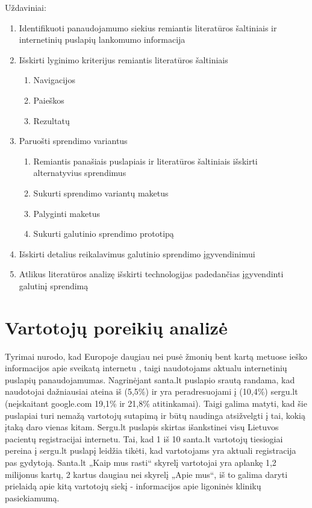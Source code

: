 \documentclass{VUMIFPSkursinis}
\begin{document}
Uždaviniai:
\begin{enumerate}
	\item Identifikuoti panaudojamumo siekius remiantis literatūros šaltiniais ir internetinių puslapių lankomumo informacija
	\item Išskirti lyginimo kriterijus remiantis literatūros šaltiniais
	\renewcommand*{\theenumii}{\theenumi.\arabic{enumii}}
	\renewcommand{\labelenumii}{\theenumii}
	\begin{enumerate}
		\item Navigacijos
		\item Paieškos
		\item Rezultatų
	\end{enumerate}
	\item Paruošti sprendimo variantus
	\begin{enumerate}
		\item Remiantis panašiais puslapiais ir literatūros šaltiniais išskirti alternatyvius sprendimus
		\item Sukurti sprendimo variantų maketus
		\item Palyginti maketus
		\item Sukurti galutinio sprendimo prototipą
	\end{enumerate}
	\item Išskirti detalius reikalavimus galutinio sprendimo įgyvendinimui
	\item Atlikus literatūros analizę išskirti technologijas padedančias įgyvendinti galutinį sprendimą
\end{enumerate}

\section{Vartotojų poreikių analizė}
Tyrimai nurodo, kad Europoje daugiau nei pusė žmonių bent kartą metuose ieško informacijos apie sveikatą internetu \cite{EuCitizDigHealthEn}, taigi naudotojams aktualu internetinių puslapių panaudojamumas. Nagrinėjant santa.lt puslapio srautą randama, kad naudotojai dažniausiai ateina iš (5,5\%) ir yra peradresuojami į (10,4\%) sergu.lt (neįskaitant google.com 19,1\% ir 21,8\% atitinkamai)\cite{AlexaSantaEn}. Taigi galima matyti, kad šie puslapiai turi nemažą vartotojų sutapimą ir būtų naudinga atsižvelgti į tai, kokią įtaką daro vienas kitam. Sergu.lt puslapis skirtas išankstinei visų Lietuvos pacientų registracijai internetu. Tai, kad 1 iš 10 santa.lt vartotojų tiesiogiai pereina į sergu.lt puslapį leidžia tikėti, kad vartotojams yra aktuali registracija pas gydytoją. Santa.lt „Kaip mus rasti“ skyrelį vartotojai yra aplankę 1,2 milijonus kartų\cite{VulSkKaipMusRastiLt}, 2 kartus daugiau nei skyrelį „Apie mus“\cite{VulSkApieMusLt}, iš to galima daryti prielaidą apie kitą vartotojų siekį - informacijos apie ligoninės klinikų pasiekiamumą.
\vspace{0,5cm}
\end{document}
